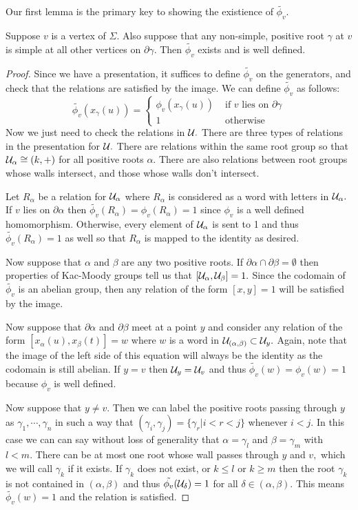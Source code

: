\documentclass[class=book, crop=false,12 pt]{standalone}
\begin{document}
Our first lemma is the primary key to showing the existience of $\tilde{\phi_v}.$
\begin{lemma}
	Suppose $v$ is a vertex of $\Sigma.$ Also suppose that any non-simple, positive root $\gamma$ at $v$ is simple at all other vertices on $\partial \gamma.$ Then $\tilde{\phi_v}$ exists and is well defined.\label{existience}
\end{lemma}
\begin{proof}
	Since we have a presentation, it suffices to define $\tilde{\phi_v}$ on the generators, and check that the relations are satisfied by the image. We can define $\tilde{\phi_v}$ as follows:
\[
	\tilde{\phi_v}(x_\gamma(u))=\begin{cases} \phi_v(x_\gamma(u))&\text{ if }v\text{ lies on }\partial \gamma\\
		1&\text{ otherwise}
	\end{cases}
	\]
	Now we just need to check the relations in $\mathcal{U}.$ There are three types of relations in the presentation for $\mathcal{U}.$ There are relations within the same root group so that $\mathcal{U}_\alpha\cong (k,+)$ for all positive roots $\alpha.$ There are also relations between root groups whose walls intersect, and those whose walls don't intersect.

	Let $R_\alpha$ be a relation for $\mathcal{U}_\alpha$ where $R_\alpha$ is considered as a word with letters in $\mathcal{U}_\alpha.$ If $v$ lies on $\partial \alpha$ then $\tilde{\phi_v}(R_\alpha)=\phi_v(R_\alpha)=1$ since $\phi_v$ is a well defined homomorphism. Otherwise, every element of $\mathcal{U}_\alpha$ is sent to 1 and thus $\tilde{\phi_v}(R_\alpha)=1$ as well so that $R_\alpha$ is mapped to the identity as desired.

	Now suppose that $\alpha$ and $\beta$ are any two positive roots. If $\partial \alpha \cap \partial \beta=\emptyset$ then properties of Kac-Moody groups tell us that $[\mathcal{U}_\alpha,\mathcal{U}_\beta]=1.$ Since the codomain of $\tilde{\phi_v}$ is an abelian group, then any relation of the form $[x,y]=1$ will be satisfied by the image.


	Now suppose that $\partial \alpha$ and $\partial \beta$ meet at a point $y$ and consider any relation of the form $[x_\alpha(u),x_\beta(t)]=w$ where $w$ is a word in $\mathcal{U}_{(\alpha,\beta)}\subset \mathcal{U}_y.$ Again, note that the image of the left side of this equation will always be the identity as the codomain is still abelian. If $y=v$ then $\mathcal{U}_y=\mathcal{U}_v$ and thus $\tilde{\phi_v}(w)=\phi_v(w)=1$ because $\phi_v$ is well defined.

	Now suppose that $y\neq v.$ Then we can label the positive roots passing through $y$ as $\gamma_1,\cdots,\gamma_n$ in such a way that $(\gamma_i,\gamma_j)=\{\gamma_{r}|i<r<j\}$ whenever $i<j.$ In this case we can can say without loss of generality that $\alpha=\gamma_l$ and $\beta=\gamma_m$ with $l<m.$  There can be at most one root whose wall passes through $y$ and $v,$ which we will call $\gamma_k$ if it exists. If $\gamma_k$ does not exist, or $k\le l$ or $k\ge m$ then the root $\gamma_k$ is not contained in $(\alpha,\beta)$ and thus $\tilde{\phi_v}(\mathcal{U}_\delta)=1$ for all $\delta\in (\alpha,\beta).$ This means $\tilde{\phi_v}(w)=1$ and the relation is satisfied.


\end{proof}
\end{document}
